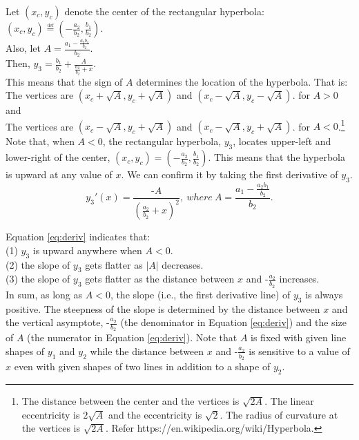 \documentclass[11pt, a4paper]{article}
\begin{document}
\noindent
Let $(x_c, y_c)$ denote the center of the rectangular hyperbola: $(x_c, y_c) \overset{\underset{\mathrm{def}}{}}{=} (-\frac{a_2}{b_2}, \frac{b_1}{b_2})$.\\
\noindent
Also, let $A = \frac{a_1-\frac{a_2 b_1}{b_2}}{b_2}$. \\
Then, $y_3= \frac{b_1}{b_2}+\frac{A}{\frac{a_2}{b_2}+x}$.\\

\noindent
This means that the sign of $A$ determines the location of the hyperbola.
That is:\\
The vertices are $(x_c+\sqrt{A}, y_c+\sqrt{A})$ and $(x_c-\sqrt{A}, y_c-\sqrt{A})$. for $A>0$ and\\
The vertices are $(x_c-\sqrt{A}, y_c+\sqrt{A})$ and $(x_c-\sqrt{A}, y_c+\sqrt{A})$. for $A<0$.\footnote{The distance between the center and the vertices is $\sqrt{2A}$. The linear eccentricity is $2\sqrt{A}$ and the eccentricity is $\sqrt{2}$. The radius of curvature at the vertices is $\sqrt{2A}$. Refer https://en.wikipedia.org/wiki/Hyperbola.}\\

\noindent
Note that, when $A<0$, the rectangular hyperbola, $y_3$, locates upper-left and lower-right of the center, $(x_c, y_c) = (-\frac{a_2}{b_2}, \frac{b_1}{b_2})$. This means that the hyperbola is upward at any value of $x$. We can confirm it by  taking the first derivative of $y_3$.\\

\noindent
\begin{equation}
\label{eq:deriv}
y_3'(x)=\frac{\mbox{-}A}{(\frac{a_2}{b_2}+x)^2},~where~A = \frac{a_1-\frac{a_2 b_1}{b_2}}{b_2}.
\end{equation}

\noindent
Equation \ref{eq:deriv} indicates that:\\ 
(1) $y_3$ is upward anywhere when $A<0$.\\
(2) the slope of $y_3$ gets flatter as $|A|$ decreases.\\
(3) the slope of $y_3$ gets flatter as the distance between $x$ and $\mbox{-}\frac{a_2}{b_2}$ increases.\\

\noindent
In sum, as long as $A<0$, the slope (i.e., the first derivative line) of $y_3$ is always positive. The steepness of the slope is determined by the distance between $x$ and the vertical asymptote, $\mbox{-}\frac{a_2}{b_2}$ (the denominator in Equation \ref{eq:deriv}) and the size of $A$ (the numerator in Equation \ref{eq:deriv}). Note that $A$ is fixed with given line shapes of $y_1$ and $y_2$ while the distance between $x$ and $\mbox{-}\frac{a_2}{b_2}$ is sensitive to a value of $x$ even with given shapes of two lines in addition to a shape of $y_2$.\\
\end{document}
